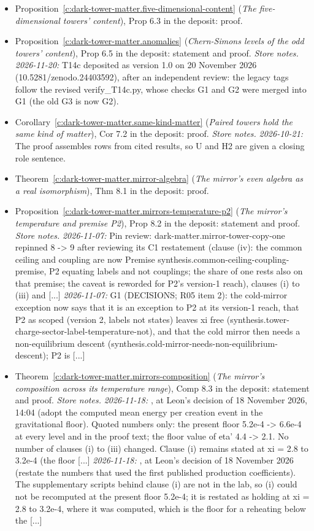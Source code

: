 \documentclass[11pt]{article}
\theoremstyle{definition}
\theoremstyle{plain}
\begin{document}
\begin{itemize}
\item Proposition~\ref{c:dark-tower-matter.five-dimensional-content} (\emph{The five-dimensional towers' content}), Prop 6.3 in the deposit: proof.
\item Proposition~\ref{c:dark-tower-matter.anomalies} (\emph{Chern-Simons levels of the odd towers' content}), Prop 6.5 in the deposit: statement and proof. \emph{Store notes.} \emph{2026-11-20:} T14c deposited as version 1.0 on 20 November 2026 (10.5281/zenodo.24403592), after an independent review: the legacy tags follow the revised verify\_T14c.py, whose checks G1 and G2 were merged into G1 (the old G3 is now G2).
\item Corollary~\ref{c:dark-tower-matter.same-kind-matter} (\emph{Paired towers hold the same kind of matter}), Cor 7.2 in the deposit: proof. \emph{Store notes.} \emph{2026-10-21:} The proof assembles rows from cited results, so U and H2 are given a closing role sentence.
\item Theorem~\ref{c:dark-tower-matter.mirror-algebra} (\emph{The mirror's even algebra as a real isomorphism}), Thm 8.1 in the deposit: proof.
\item Proposition~\ref{c:dark-tower-matter.mirrors-temperature-p2} (\emph{The mirror's temperature and premise P2}), Prop 8.2 in the deposit: statement and proof. \emph{Store notes.} \emph{2026-11-07:} Pin review: dark-matter.mirror-tower-copy-one repinned 8 -> 9 after reviewing its C1 restatement (clause (iv): the common ceiling and coupling are now Premise synthesis.common-ceiling-coupling-premise, P2 equating labels and not couplings; the share of one rests also on that premise; the caveat is reworded for P2's version-1 reach), clauses (i) to (iii) and [...] \emph{2026-11-07:} G1 (DECISIONS; R05 item 2): the cold-mirror exception now says that it is an exception to P2 at its version-1 reach, that P2 as scoped (version 2, labels not states) leaves xi free (synthesis.tower-charge-sector-label-temperature-not), and that the cold mirror then needs a non-equilibrium descent (synthesis.cold-mirror-needs-non-equilibrium-descent); P2 is [...]
\item Theorem~\ref{c:dark-tower-matter.mirrors-composition} (\emph{The mirror's composition across its temperature range}), Comp 8.3 in the deposit: statement and proof. \emph{Store notes.} \emph{2026-11-18:} , at Leon's decision of 18 November 2026, 14:04 (adopt the computed mean energy per creation event in the gravitational floor). Quoted numbers only: the present floor 5.2e-4 -> 6.6e-4 at every level and in the proof text; the floor value of eta' 4.4 -> 2.1. No number of clauses (i) to (iii) changed. Clause (i) remains stated at xi = 2.8 to 3.2e-4 (the floor [...] \emph{2026-11-18:} , at Leon's decision of 18 November 2026 (restate the numbers that used the first published production coefficients). The supplementary scripts behind clause (i) are not in the lab, so (i) could not be recomputed at the present floor 5.2e-4; it is restated as holding at xi = 2.8 to 3.2e-4, where it was computed, which is the floor for a reheating below the [...]

\end{itemize}
\end{document}
